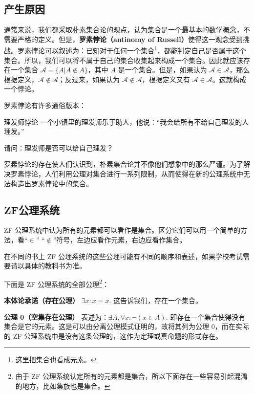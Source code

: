\begin{issues}
\issueTODO
\end{issues}

\subsection{产生原因}
通常来说，我们都采取朴素集合论的观点，认为集合是一个最基本的数学概念，不需要严格的定义。但是，\textbf{罗素悖论（antinomy of Russell）}使得这一观念受到挑战。罗素悖论可以叙述为：已知对于任何一个集合\footnote{这里把集合也看成元素。}，都能判定自己是否属于这个集合。所以，我们可以将不属于自己的集合收集起来构成一个集合。因此就应该存在一个集合 $\mathcal{A}=\{A|A\notin A\}$，其中 $A$ 是一个集合。但是，如果认为 $\mathcal{A}\in\mathcal{A}$，那么根据定义，$\mathcal{A}\notin\mathcal{A}$；反过来，如果认为 $\mathcal{A}\notin\mathcal{A}$，根据定义又有 $\mathcal{A}\in\mathcal{A}$。这就构成一个悖论。

罗素悖论有许多通俗版本：
\begin{example}{理发师悖论}
一个小镇里的理发师乐于助人，他说：“我会给所有不给自己理发的人理发。”

请问：理发师是否可以给自己理发？
\end{example}

罗素悖论的存在使人们认识到，朴素集合论并不像他们想象中的那么严谨。为了解决罗素悖论，人们利用公理对集合进行一系列限制，从而使得在新的公理系统中无法构造出罗素悖论中的集合。

\subsection{ZF公理系统}
ZF 公理系统中认为所有的元素都可以看作是集合。区分它们可以用一个简单的方法，看“$\in$” “$\notin$”符号，左边应看作元素，右边应看作集合。

在不同的书上 ZF 公理系统的这些公理可能有不同的顺序和表述，如果学校考试需要请以具体的教科书为准。

下面是 ZF 公理系统的全部公理\footnote{由于 ZF 公理系统认定所有的元素都是集合，所以下面存在一些容易引起混淆的地方，比如集族也是集合。}：

\textbf{本体论承诺（存在公理）} $\exists x: x=x.$ 这告诉我们，存在一个集合。

\textbf{公理 0（空集存在公理）} 表述为：$\exists A,  \forall x: \neg ( x \in A).$ 即存在一个集合使得没有集合是它的元素。这是可以由分离公理模式证明的，故将其列为公理 0，而在实际的 ZF 公理系统中是没有这条公理的，这作为定理或真命题的形式存在。

